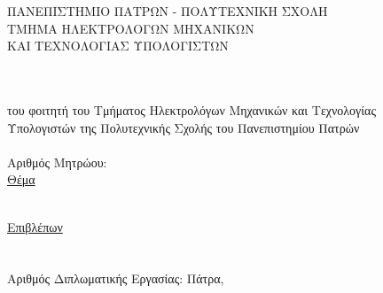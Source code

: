 
\begin{titlepage}
\begin{center}
\textsc{\large ΠΑΝΕΠΙΣΤΗΜΙΟ ΠΑΤΡΩΝ - ΠΟΛΥΤΕΧΝΙΚΗ ΣΧΟΛΗ\\
\large ΤΜΗΜΑ ΗΛΕΚΤΡΟΛΟΓΩΝ ΜΗΧΑΝΙΚΩΝ\\ΚΑΙ ΤΕΧΝΟΛΟΓΙΑΣ ΥΠΟΛΟΓΙΣΤΩΝ}\\[0.5cm]


\division \\
\lab \\[1cm]

\textsc{\uline{\LARGE{\shortdoctitle}}}

του φοιτητή του Τμήματος Ηλεκτρολόγων Μηχανικών και Τεχνολογίας\\
Υπολογιστών της Πολυτεχνικής Σχολής  του Πανεπιστημίου Πατρών\\[0.5cm]

\megeniki\\
Αριθμός Μητρώου: \studnum\\[0.5cm]

\uline{\large Θέμα}\\[0.5cm]

\begingroup
    \fontsize{17pt}{12pt}\selectfont
	\textbf{\doctitle }\\[1cm]
\endgroup

\uline{\large Επιβλέπων}\\[0.5cm]
\large \supname \, \\ \suptitle \\[1cm]
\large{Αριθμός Διπλωματικής Εργασίας: }\hspace{3cm}
\vfill
\large{Πάτρα, \monthyear}
\end{center}
\end{titlepage}

